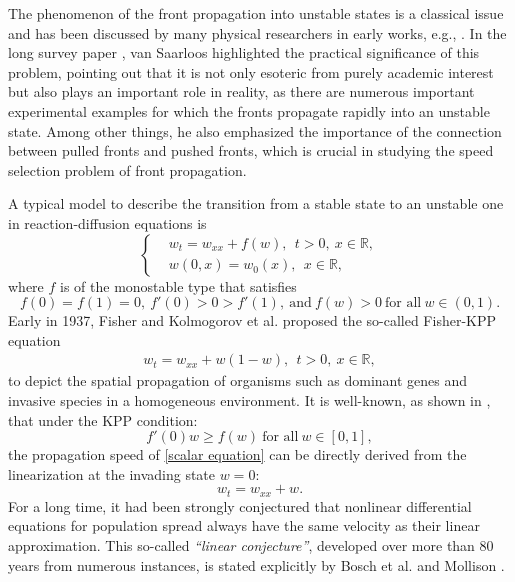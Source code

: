 \documentclass[11pt,a4paper]{article}
\numberwithin{equation}{section}
\numberwithin{figure}{section}
\newcommand\beaa{\begin{eqnarray*}}
\newcommand\eeaa{\end{eqnarray*}}
\begin{document}
The phenomenon of the front propagation into unstable states is a classical issue and has been discussed by many physical researchers in early works, e.g.,
\cite{Benguria Depassier1994,Benguria Depassier1996, van Saarloos1988,van Saarloos1989,van Saarloos2003}.
In the long survey paper \cite{van Saarloos2003}, van Saarloos highlighted the practical significance of this problem, pointing out that it
 is not only esoteric from purely academic interest but also plays an important role in reality,
as there are numerous important experimental examples
for which the fronts propagate rapidly into an unstable state.
Among other things, he also
emphasized the importance of the connection %
between pulled fronts and pushed fronts, which is crucial in studying the speed selection problem of %
front propagation. %



A typical model to describe the transition from a stable state to an unstable one in reaction-diffusion equations is
\begin{equation}\label{scalar equation}
\left\{
\begin{aligned}
&w_t=w_{xx}+f(w),\ \ t>0,\ x\in\mathbb{R},\\
&w(0,x)=w_0(x),\ \ x\in\mathbb{R},
\end{aligned}
\right.
\end{equation}
where %
$f$ is of the monostable type that satisfies
\begin{equation*}
f(0)=f(1)=0,\ f'(0)>0>f'(1),\ \text{and}\ f(w)>0\ \text{for all}\ w\in(0,1).
\end{equation*}
Early in 1937,  Fisher \cite{Fisher} and Kolmogorov  et al. \cite{KPP} proposed the so-called Fisher-KPP equation 
\beaa%
w_t=w_{xx}+w(1-w),\ \ t>0,\ x\in\mathbb{R},
\eeaa
to depict the spatial propagation of organisms such as dominant genes and invasive species in a homogeneous environment. 
It is well-known, as shown in \cite{Fisher,KPP}, that under the KPP condition:
\begin{equation}\label{kpp condition}
f'(0)w\geq f(w)\ \text{for all}\ w\in[0,1],
\end{equation}
the propagation speed of \eqref{scalar equation} can be directly derived from the linearization at the invading state $w=0$:
$$w_t=w_{xx}+w.$$
For a long time, it had been strongly conjectured that nonlinear differential equations for population spread always have the same velocity as their linear approximation.
This so-called {\it ``linear conjecture''}, developed over more than $80$ years from numerous instances, is stated explicitly by Bosch et al. \cite{Bosch Metz Diekmann} and Mollison \cite{Mollison}.
\end{document}
